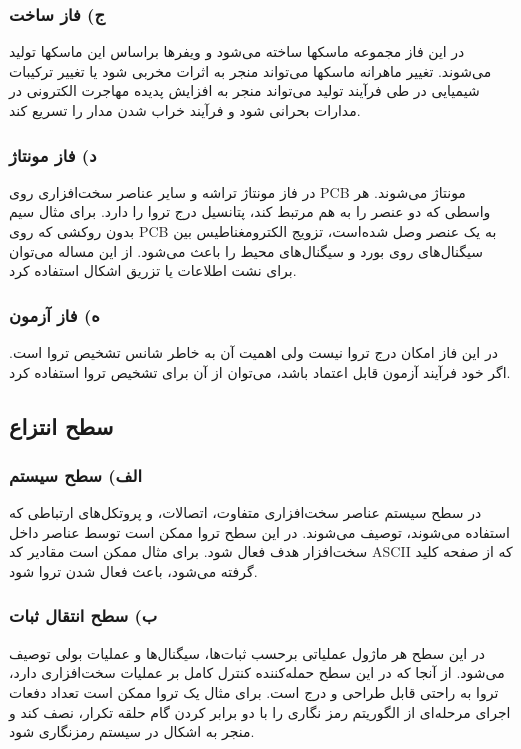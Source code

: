 \subsubsection {ج) فاز ساخت}
در این فاز مجموعه ماسکها ساخته می‌شود و ویفرها براساس این ماسکها تولید می‌شوند. تغییر ماهرانه ماسکها می‌تواند منجر به اثرات مخربی شود یا تغییر ترکیبات شیمیایی در طی فرآیند تولید می‌تواند منجر به افزایش پدیده مهاجرت الکترونی در مدارات بحرانی شود و فرآیند خراب شدن مدار را تسریع کند.
\subsubsection {د) فاز مونتاژ}
در فاز مونتاژ تراشه و سایر عناصر سخت‌افزاری روی PCB  مونتاژ می‌شوند. هر واسطی که دو عنصر را به هم مرتبط کند، پتانسیل درج تروا را دارد. برای مثال سیم بدون روکشی که روی PCB به یک عنصر وصل شده‌است، تزویج الکترومغناطیس  بین سیگنال‌های روی بورد و سیگنال‌های محیط را باعث می‌شود. از این مساله می‌توان برای نشت اطلاعات یا تزریق اشکال استفاده کرد.

\subsubsection {ه) فاز آزمون}
در این فاز امکان درج تروا نیست ولی اهمیت آن به خاطر شانس تشخیص تروا است. اگر خود فرآیند آزمون قابل اعتماد باشد، می‌توان از آن برای تشخیص تروا استفاده کرد.


\subsection{سطح انتزاع}
\subsubsection {الف) سطح سیستم}
در سطح سیستم عناصر سخت‌افزاری متفاوت، اتصالات، و پروتکل‌های ارتباطی که استفاده می‌شوند، توصیف می‌شوند. در این سطح تروا ممکن است توسط عناصر داخل سخت‌افزار هدف فعال شود. برای مثال ممکن است مقادیر کد ASCII که از صفحه کلید گرفته می‌شود، باعث فعال شدن تروا شود.
\subsubsection {ب) سطح انتقال ثبات}
در این سطح هر ماژول عملیاتی برحسب ثبات‌ها، سیگنال‌ها و عملیات بولی توصیف می‌شود. از آنجا که در این سطح حمله‌کننده کنترل کامل بر عملیات سخت‌افزاری دارد، تروا به راحتی قابل طراحی و درج است. برای مثال یک تروا ممکن است تعداد دفعات اجرای مرحله‌ای از الگوریتم رمز نگاری را با دو برابر کردن گام حلقه تکرار، نصف کند و منجر به اشکال در سیستم رمزنگاری شود.
